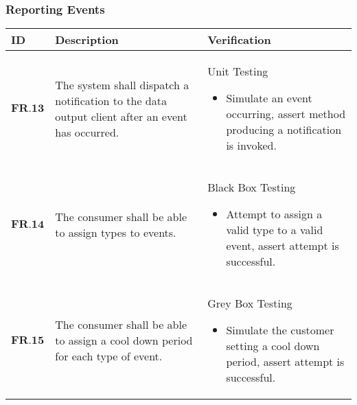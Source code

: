 \subsubsection{Reporting Events}
\begin{longtable}[H]{| p{1.5cm}| p{4.5cm}| p{10.5cm}|}
        \hline
        \cellcolor{titleColor}\textbf{ID}    & \cellcolor{titleColor}\textbf{Description}                                                                                                                                              & \cellcolor{titleColor}\textbf{Verification}                                                                                                                                                                                                                                                                                                                                      \\ \hline
        $\textbf{FR.13}$ & The system shall dispatch a notification to the data output client after an event has occurred.                                                                  & Unit Testing\begin{itemize}\item Simulate an event occurring, assert method producing a notification is invoked.\end{itemize}                                                                                                                                                                                                               \\ \hline
        $\textbf{FR.14}$ & The consumer shall be able to assign types to events.                                                                                                            & Black Box Testing\begin{itemize}\item Attempt to assign a valid type to a valid event, assert attempt is successful.\end{itemize}                                                                                                                                                                                                                \\ \hline
        $\textbf{FR.15}$ & The consumer shall be able to assign a cool down period for each type of event.                                                                                  & Grey Box Testing\begin{itemize}\item Simulate the customer setting a cool down period, assert attempt is successful.\end{itemize}                                                                                                                                                                                                                \\ \hline

\end{longtable}
